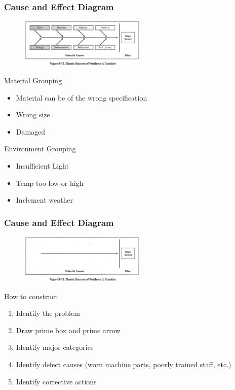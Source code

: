 \begin{frame}
\frametitle{Cause and Effect Diagram}
\begin{figure}
	\centering
		\includegraphics[width = 6cm]{images/ish.jpg}
	\label{fig:ishc}
\end{figure}
Material Grouping\\
\begin{itemize}
	\item Material can be of the wrong specification
	\item Wrong size
	\item Damaged
\end{itemize}
Environment Grouping\\
\begin{itemize}
	\item Insufficient Light
	\item Temp too low or high
	\item Inclement weather
\end{itemize}
\end{frame}




\begin{frame}
\frametitle{Cause and Effect Diagram}
\begin{figure}
	\centering
		\includegraphics[width = 6cm]{images/ish3.jpg}
	\label{fig:ish3a}
\end{figure}
How to construct
\begin{enumerate}
	\item Identify the problem
	\item Draw prime box and prime arrow
	\item Identify major categories
	\item Identify defect causes (worn machine parts, poorly trained staff, etc.)
	\item Identify corrective actions
\end{enumerate}
\end{frame}




